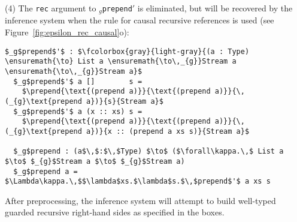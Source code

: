 (4) The \texttt{rec} argument to \texttt{$_g$prepend$'$} is eliminated, but will
be recovered by the inference system when the rule for causal recursive
references is used (see Figure~\ref{fig:epsilon_rec_causal}o):
\begin{lstlisting}[mathescape,title=\ttBlock]
  $_g$prepend$'$ : $\fcolorbox{gray}{light-gray}{(a : Type) \ensuremath{\to} List a \ensuremath{\to\,_{g}}Stream a \ensuremath{\to\,_{g}}Stream a}$
  $_g$prepend$'$ a []        s =
    $\prepend{\text{(prepend a)}}{\text{(prepend a)}}{\,(_{g}\text{prepend a})}{s}{Stream a}$
  $_g$prepend$'$ a (x :: xs) s =
    $\prepend{\text{(prepend a)}}{\text{(prepend a)}}{\,(_{g}\text{prepend a})}{x :: (prepend a xs s)}{Stream a}$

  $_g$prepend : (a$\,$:$\,$Type) $\to$ ($\forall\kappa.\,$ List a $\to$ $_{g}$Stream a $\to$ $_{g}$Stream a)
  $_g$prepend a = $\Lambda\kappa.\,$$\lambda$xs.$\lambda$s.$\,$prepend$'$ a xs s
\end{lstlisting}
After preprocessing, the inference system will attempt to build well-typed
guarded recursive right-hand sides as specified in the boxes.

\newcommand{\evens}[5]{\ensuremath{\boxed{IE\,\vdash\,\text{#4}\,:\,\text{#5}\,\infer
        \text{?}\,:\,\forall\kappa.\,_{g}\text{#5})}}}
\newcommand{\evensm}[5]{\ensuremath{\boxed{
            \begin{matrix*}[l] IE\,\vdash \\
                           \quad\text{#4}\,:\,\text{#5}\,\infer\,\text{?}\,:\,\forall\kappa.\,_{g}\text{#5})
            \end{matrix*}
            }}}

